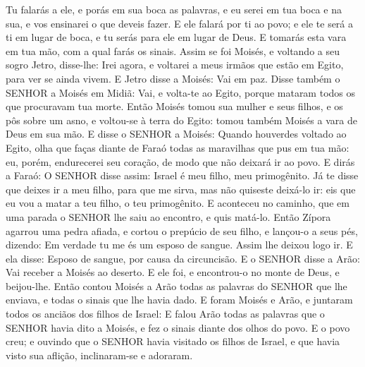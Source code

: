{Tu falarás a ele, e porás em sua boca as palavras, e eu serei em tua boca e na sua, e vos ensinarei o que deveis fazer.
E ele falará por ti ao povo; e ele te será a ti em lugar de boca, e tu serás para ele em lugar de Deus.
E tomarás esta vara em tua mão, com a qual farás os sinais.
Assim se foi Moisés, e voltando a seu sogro Jetro, disse-lhe: Irei agora, e voltarei a meus irmãos que estão em Egito, para ver se ainda vivem. E Jetro disse a Moisés: Vai em paz.
Disse também o SENHOR a Moisés em Midiã: Vai, e volta-te ao Egito, porque mataram todos os que procuravam tua morte.
Então Moisés tomou sua mulher e seus filhos, e os pôs sobre um asno, e voltou-se à terra do Egito: tomou também Moisés a vara de Deus em sua mão.
E disse o SENHOR a Moisés: Quando houverdes voltado ao Egito, olha que faças diante de Faraó todas as maravilhas que pus em tua mão: eu, porém, endurecerei seu coração, de modo que não deixará ir ao povo.
E dirás a Faraó: O SENHOR disse assim: Israel é meu filho, meu primogênito.
Já te disse que deixes ir a meu filho, para que me sirva, mas não quiseste deixá-lo ir: eis que eu vou a matar a teu filho, o teu primogênito.
E aconteceu no caminho, que em uma parada o SENHOR lhe saiu ao encontro, e quis matá-lo.
Então Zípora agarrou uma pedra afiada, e cortou o prepúcio de seu filho, e lançou-o a seus pés, dizendo: Em verdade tu me és um esposo de sangue.
Assim lhe deixou logo ir. E ela disse: Esposo de sangue, por causa da circuncisão.
E o SENHOR disse a Arão: Vai receber a Moisés ao deserto. E ele foi, e encontrou-o no monte de Deus, e beijou-lhe.
Então contou Moisés a Arão todas as palavras do SENHOR que lhe enviava, e todas o sinais que lhe havia dado.
E foram Moisés e Arão, e juntaram todos os anciãos dos filhos de Israel:
E falou Arão todas as palavras que o SENHOR havia dito a Moisés, e fez o sinais diante dos olhos do povo.
E o povo creu; e ouvindo que o SENHOR havia visitado os filhos de Israel, e que havia visto sua aflição, inclinaram-se e adoraram.

}
